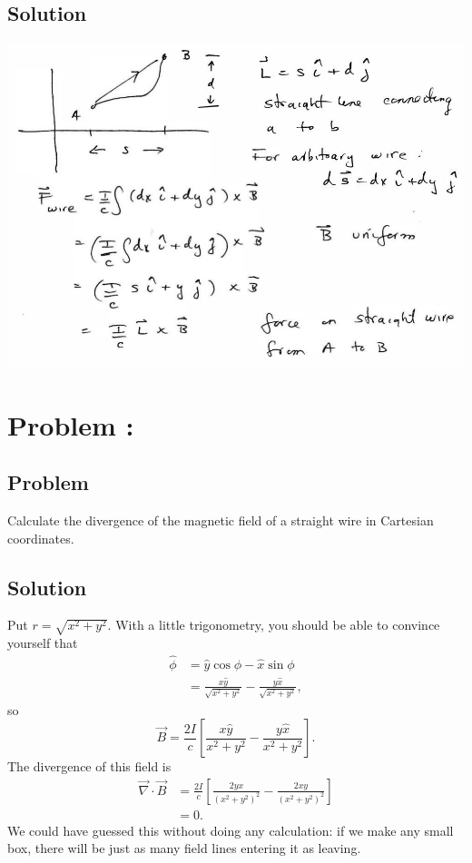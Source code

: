 \documentclass[solutions]{esg8022pset}
\begin{document}
\subsection{Solution}
  \begin{center}\includegraphics{ps07_sol_04_1.pdf}\end{center}
\section{Problem \thesection: }
\subsection{Problem}
  Calculate the divergence of the magnetic field of a straight wire in Cartesian coordinates.
\subsection{Solution}
  Put $r = \sqrt{x^2 + y^2}$.  With a little trigonometry, you should be able to convince yourself that
  \begin{align*}
    \hat\phi & = \hat y \cos\phi - \hat x\sin\phi \\
      & = \frac{x\hat y}{\sqrt{x^2 + y^2}} - \frac{y\hat x}{\sqrt{x^2 + y^2}},
  \end{align*}
  so
  $$\vec B = \frac{2I}{c}\left[\frac{x\hat y}{x^2 + y^2} - \frac{y\hat x}{x^2 + y^2}\right].$$
  The divergence of this field is
  \begin{align*}
    \vec\nabla \cdot \vec B & = \frac{2I}{c}\left[\frac{2yx}{(x^2 + y^2)^2} - \frac{2xy}{(x^2 + y^2)^2}\right] \\
      & = 0.
  \end{align*}
  We could have guessed this without doing any calculation: if we make any small box, there will be just as many field lines entering it as leaving.
\end{document}
